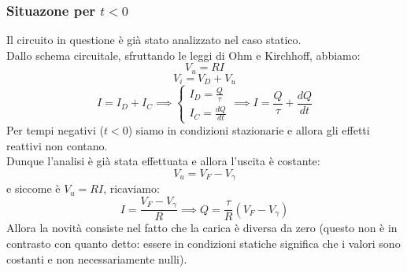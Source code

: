 \documentclass{article}
\numberwithin{equation}{subsection}
\begin{document}
	\subsubsection{Situazone per $t<0$}
	Il circuito in questione è già stato analizzato nel caso statico. \\
	Dallo schema circuitale, sfruttando le leggi di Ohm e Kirchhoff, abbiamo:
	$$V_u = RI$$
	$$V_i = V_D + V_u$$
	$$I = I_D + I_C \implies \begin{cases} I_D = \frac{Q}{\tau} \\ I_C = \frac{dQ}{dt} \end{cases} \implies I = \frac{Q}{\tau} + \frac{dQ}{dt}$$
	Per tempi negativi ($t < 0$) siamo in condizioni stazionarie e allora gli effetti reattivi non contano. \\
	Dunque l’analisi è già stata effettuata e allora l’uscita è costante:
	$$V_u = V_F - V_\gamma$$
	e siccome è $V_u = RI$, ricaviamo:
	$$I = \frac{V_F - V_\gamma}{R} \implies Q = \frac{\tau}{R} (V_F - V_\gamma)$$
	Allora la novità consiste nel fatto che la carica è diversa da zero (questo non è in contrasto con quanto detto: essere in condizioni statiche significa che i valori sono costanti e non necessariamente nulli).
\end{document}
